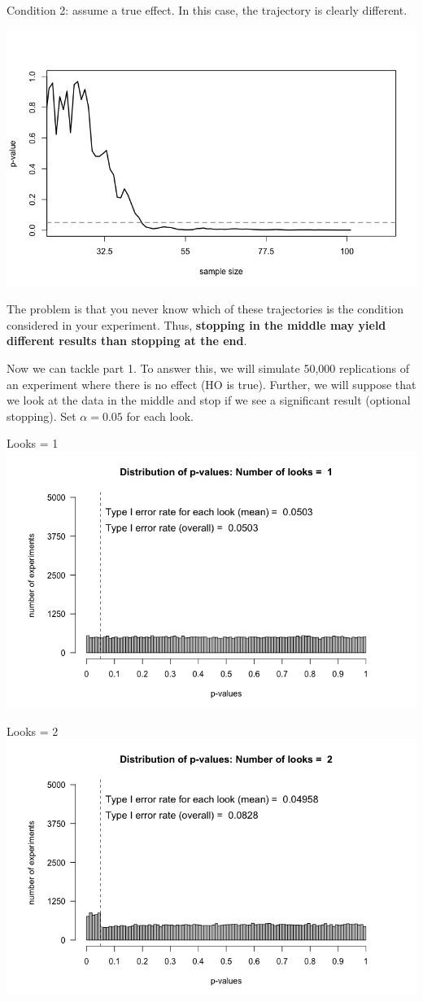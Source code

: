\documentclass[11pt]{article}
\begin{document}
Condition 2: assume a true effect.  In this case, the trajectory is clearly different.

\includegraphics[width=.9\linewidth]{figures/pValues-trueEffect.png}

The problem is that you never know which of these trajectories is the condition considered in your experiment.  Thus, \textbf{stopping in the middle may yield different results than stopping at the end}.


Now we can tackle part 1.  To answer this, we will simulate 50,000 replications of an experiment where there is no effect (HO is true).  Further, we will suppose that we look at the data in the middle and stop if we see a significant result (optional stopping).  Set $\alpha=0.05$ for each look.

Looks = 1
\includegraphics[width=.9\linewidth]{figures/looks-1.png}

Looks = 2
\includegraphics[width=.9\linewidth]{figures/looks-2.png}
\end{document}
